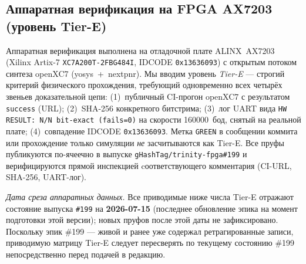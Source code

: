 \documentclass[11pt,a4paper]{article}
\theoremstyle{plain}
\begin{document}
\subsection{Аппаратная верификация на FPGA AX7203 (уровень Tier-E)}\label{sec:hw-ax7203}
Аппаратная верификация выполнена на
отладочной плате ALINX~AX7203 (Xilinx Artix-7 \texttt{XC7A200T-2FBG484I},
IDCODE \texttt{0x13636093}) с открытым потоком синтеза openXC7
(yosys~+~nextpnr). Мы вводим уровень \emph{Tier-E} --- строгий критерий
физического прохождения, требующий одновременно всех четырёх звеньев
доказательной цепи: (1)~публичный CI-прогон openXC7 с результатом
\texttt{success} (URL); (2)~SHA-256 конкретного битстрима; (3)~лог UART
вида \texttt{HW RESULT: N/N bit-exact (fails=0)} на скорости 160000~бод,
снятый на реальной плате; (4)~совпадение IDCODE
\texttt{0x13636093}. Метка \texttt{GREEN} в сообщении коммита или прохождение
только симуляции \emph{не} засчитываются как Tier-E. Все пруфы
публикуются по-ячеечно в выпуске
\texttt{gHashTag/trinity-fpga\#199} и верифицируются прямой инспекцией
cоответствующего комментария (CI-URL, SHA-256, UART-лог).

\emph{Дата среза аппаратных данных.} Все приводимые ниже числа Tier-E
отражают состояние выпуска \texttt{\#199} на \textbf{2026-07-15} (последнее
обновление эпика на момент подготовки этой версии); новых пруфов после этой
даты не зафиксировано. Поскольку эпик \#199 --- живой и ранее уже содержал
ретрагированные записи, приводимую матрицу Tier-E следует пересверять по
текущему состоянию \#199 непосредственно перед подачей в редакцию.
\end{document}
